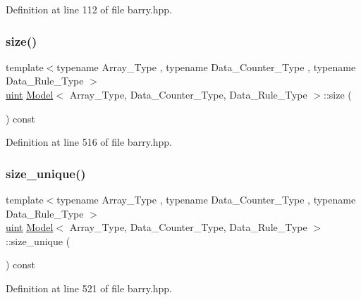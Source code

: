 Definition at line 112 of file barry.\+hpp.

\mbox{\label{classbarry_1_1_model_ab3f157dbb542a48fe5bf412ff7d467fd}} 
\subsubsection{\texorpdfstring{size()}{size()}}
{\footnotesize\ttfamily template$<$typename Array\+\_\+\+Type , typename Data\+\_\+\+Counter\+\_\+\+Type , typename Data\+\_\+\+Rule\+\_\+\+Type $>$ \\
\hyperlink{namespacebarry_a11dfc53ddb4672278319aa04f1e09a6c}{uint} \hyperlink{classbarry_1_1_model}{Model}$<$ Array\+\_\+\+Type, Data\+\_\+\+Counter\+\_\+\+Type, Data\+\_\+\+Rule\+\_\+\+Type $>$\+::size (\begin{DoxyParamCaption}{ }\end{DoxyParamCaption}) const\hspace{0.3cm}{\ttfamily [inline]}}



Definition at line 516 of file barry.\+hpp.

\mbox{\label{classbarry_1_1_model_a4b5edbe891b6da2319ea3fa6f1aba11d}} 
\subsubsection{\texorpdfstring{size\+\_\+unique()}{size\_unique()}}
{\footnotesize\ttfamily template$<$typename Array\+\_\+\+Type , typename Data\+\_\+\+Counter\+\_\+\+Type , typename Data\+\_\+\+Rule\+\_\+\+Type $>$ \\
\hyperlink{namespacebarry_a11dfc53ddb4672278319aa04f1e09a6c}{uint} \hyperlink{classbarry_1_1_model}{Model}$<$ Array\+\_\+\+Type, Data\+\_\+\+Counter\+\_\+\+Type, Data\+\_\+\+Rule\+\_\+\+Type $>$\+::size\+\_\+unique (\begin{DoxyParamCaption}{ }\end{DoxyParamCaption}) const\hspace{0.3cm}{\ttfamily [inline]}}



Definition at line 521 of file barry.\+hpp.

